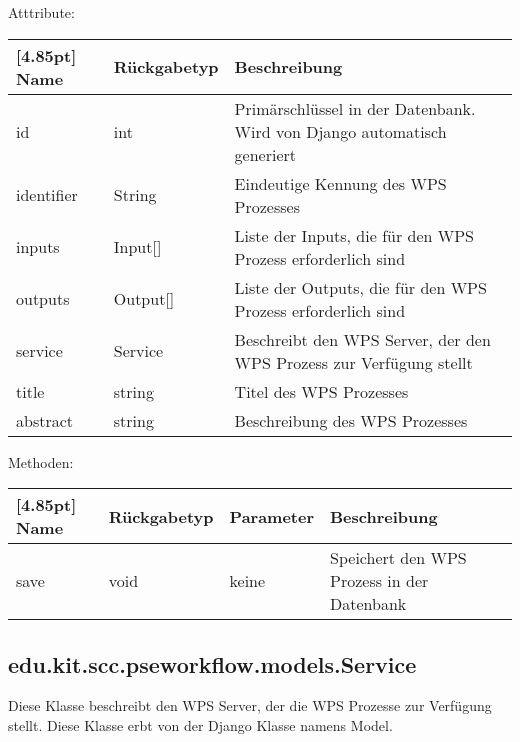 			Atttribute:
			\begin{center}
				\setlength\tabcolsep{5pt}
				\renewcommand{\arraystretch}{1.5}
				
				\begin{tabularx}{\textwidth}{|l|l|X|}
					\hline
					\rowcolor[gray]{0.75}[4.85pt]
					Name & Rückgabetyp & Beschreibung \\ \hline 
					id & int & Primärschlüssel in der Datenbank. Wird von Django automatisch generiert \\ \hline
					identifier & String & Eindeutige Kennung des WPS Prozesses \\ \hline
					inputs & Input[] &  Liste der Inputs, die für den WPS Prozess erforderlich sind\\ \hline
					outputs & Output[] & Liste der Outputs, die für den WPS Prozess erforderlich sind \\ \hline
					service & Service & Beschreibt den WPS Server, der den WPS Prozess zur Verfügung stellt   \\ \hline
					title & string & Titel des WPS Prozesses \\ \hline
					abstract & string & Beschreibung des WPS Prozesses\\
					\hline
				\end{tabularx}
			\end{center}
			
			Methoden:
			\begin{center}
				\setlength\tabcolsep{5pt}
				\renewcommand{\arraystretch}{1.5}
				
				\begin{tabularx}{\textwidth}{|l|l|l|X|}
					\hline
					\rowcolor[gray]{0.75}[4.85pt]
					Name & Rückgabetyp & Parameter & Beschreibung \\ \hline 
					save & void & keine & Speichert den WPS Prozess in der Datenbank  \\
					\hline
				\end{tabularx}
			\end{center}
			
			

        \subsection{edu.kit.scc.pseworkflow.models.Service}
			Diese Klasse beschreibt den WPS Server, der die WPS Prozesse zur Verfügung stellt. \newline
			Diese Klasse erbt von der Django Klasse namens \glqq Model\grqq .
			

